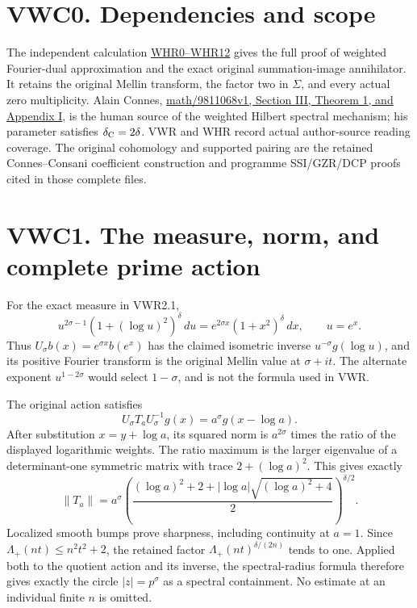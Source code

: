 \section{VWC0. Dependencies and
scope}\label{vwc0.-dependencies-and-scope}

The independent calculation
\href{https://github.com/KokunoYumeto/zeta-function-research-reader/blob/main/workbenches/splitzero-tandem/continuations/20260925-full-source-tensor-and-original-divisor/counterfactual/WEIGHTED_HILBERT_RETURN_AND_EXACT_KERNEL.md}{WHR0--WHR12}
gives the full proof of weighted Fourier-dual approximation and the
exact original summation-image annihilator. It retains the original
Mellin transform, the factor two in \(\Sigma\), and every actual zero
multiplicity. Alain Connes,
\href{https://arxiv.org/abs/math/9811068v1}{math/9811068v1, Section III,
Theorem 1, and Appendix I}, is the human source of the weighted Hilbert
spectral mechanism; his parameter satisfies \(\delta_{\rm C}=2\delta\).
VWR and WHR record actual author-source reading coverage. The original
cohomology and supported pairing are the retained Connes--Consani
coefficient construction and programme SSI/GZR/DCP proofs cited in those
complete files.

\section{VWC1. The measure, norm, and complete prime
action}\label{vwc1.-the-measure-norm-and-complete-prime-action}

For the exact measure in VWR2.1, \[
u^{2\sigma-1}(1+(\log u)^2)^\delta\,du
=e^{2\sigma x}(1+x^2)^\delta\,dx,\qquad u=e^x.
\] Thus \(U_\sigma b(x)=e^{\sigma x}b(e^x)\) has the claimed isometric
inverse \(u^{-\sigma}g(\log u)\), and its positive Fourier transform is
the original Mellin value at \(\sigma+it\). The alternate exponent
\(u^{1-2\sigma}\) would select \(1-\sigma\), and is not the formula used
in VWR.

The original action satisfies \[
U_\sigma T_aU_\sigma^{-1}g(x)=a^\sigma g(x-\log a).
\] After substitution \(x=y+\log a\), its squared norm is
\(a^{2\sigma}\) times the ratio of the displayed logarithmic weights.
The ratio maximum is the larger eigenvalue of a determinant-one
symmetric matrix with trace \(2+(\log a)^2\). This gives exactly \[
\|T_a\|=a^\sigma
\left(\frac{(\log a)^2+2+|\log a|\sqrt{(\log a)^2+4}}2\right)^{\delta/2}.
\] Localized smooth bumps prove sharpness, including continuity at
\(a=1\). Since \(\Lambda_+(nt)\leq n^2t^2+2\), the retained factor
\(\Lambda_+(nt)^{\delta/(2n)}\) tends to one. Applied both to the
quotient action and its inverse, the spectral-radius formula therefore
gives exactly the circle \(|z|=p^\sigma\) as a spectral containment. No
estimate at an individual finite \(n\) is omitted.

